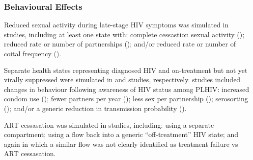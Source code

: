 \subsubsection{Behavioural Effects} %
\label{sss:res:beh}
Reduced sexual activity during late-stage HIV symptoms was simulated in  studies,
including at least one state with:
complete cessastion sexual activity ();  %
reduced rate or number of partnerships (); and/or
reduced rate or number of coital frequency (). %
\par
Separate health states representing diagnosed HIV and on-treatment but not yet virally suppressed
were simulated in  and  studies, respectively.
 studies included changes in behaviour following awareness of HIV status among PLHIV:
increased condom use ();
fewer partners per year ();
less sex per partnership (); %
serosorting\cite{} (); and/or
a generic reduction in transmission probability ().
\par
ART cessasation was simulated in  studies, including:  %
 using a separate compartment; %
 using a flow back into a generic ``off-treatment'' HIV state; and again %
 in which a similar flow was not clearly identified as treatment failure vs ART cessasation.  %
